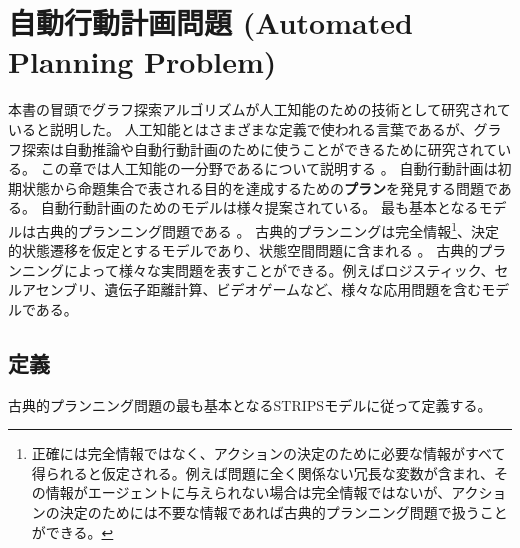 
\chapter{自動行動計画問題 (Automated Planning Problem)}
\label{ch:classical-planning}

本書の冒頭でグラフ探索アルゴリズムが人工知能のための技術として研究されていると説明した。
人工知能とはさまざまな定義で使われる言葉であるが、グラフ探索は自動推論や自動行動計画のために使うことができるために研究されている。
この章では人工知能の一分野であるについて説明する \cite{ghallab:04}。
自動行動計画は初期状態から命題集合で表される目的を達成するための{\bf プラン}を発見する問題である。
自動行動計画のためのモデルは様々提案されている。
最も基本となるモデルは古典的プランニング問題である \cite{fikes:71}。
古典的プランニングは完全情報\footnote{正確には完全情報ではなく、アクションの決定のために必要な情報がすべて得られると仮定される。例えば問題に全く関係ない冗長な変数が含まれ、その情報がエージェントに与えられない場合は完全情報ではないが、アクションの決定のためには不要な情報であれば古典的プランニング問題で扱うことができる。}、決定的状態遷移を仮定とするモデルであり、状態空間問題に含まれる \cite{fikes:71}。
古典的プランニングによって様々な実問題を表すことができる。例えばロジスティック\cite{helmert2010scanalyzer,sousa2013toward}、セルアセンブリ\cite{asai2014fully}、遺伝子距離計算\cite{erdem2005genome}、ビデオゲーム\cite{lipovetzky2015a}など、様々な応用問題を含むモデルである。

\section{定義}
\label{sec:planning-definition}

古典的プランニング問題の最も基本となるSTRIPSモデル\cite{fikes:71}に従って定義する。


